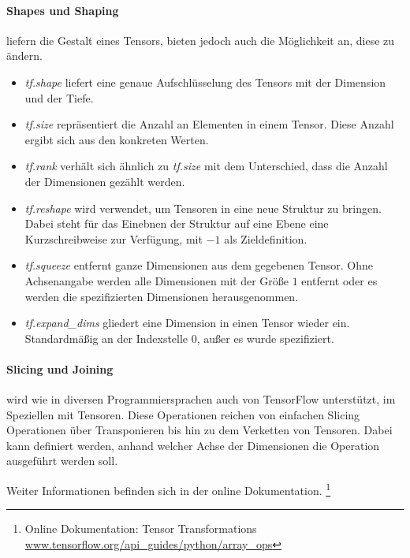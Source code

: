 \paragraph{Shapes und Shaping} liefern die Gestalt eines Tensors, bieten jedoch auch die Möglichkeit an, diese zu ändern. 
\begin{itemize}
	\item \textit{tf.shape} liefert eine genaue Aufschlüsselung des Tensors mit der Dimension und der Tiefe.
	\item \textit{tf.size} repräsentiert die Anzahl an Elementen in einem Tensor. 
	Diese Anzahl ergibt sich aus den konkreten Werten.
	\item \textit{tf.rank} verhält sich ähnlich zu \textit{tf.size} mit dem Unterschied, dass die Anzahl der Dimensionen gezählt werden.
	\item \textit{tf.reshape} wird verwendet, um Tensoren in eine neue Struktur zu bringen. 
	Dabei steht für das Einebnen der Struktur auf eine Ebene eine Kurzschreibweise zur Verfügung, mit $-1$ als Zieldefinition. 
	\item \textit{tf.squeeze} entfernt ganze Dimensionen aus dem gegebenen Tensor. 
	Ohne Achsenangabe werden alle Dimensionen mit der Größe $1$ entfernt oder es werden die spezifizierten Dimensionen herausgenommen.
	\item \textit{tf.expand\_dims} gliedert eine Dimension in einen Tensor wieder ein. 
	Standardmäßig an der Indexstelle $0$, außer es wurde spezifiziert.
\end{itemize}

\paragraph{Slicing und Joining} wird wie in diversen Programmiersprachen auch von TensorFlow unterstützt, im Speziellen mit Tensoren. 
Diese Operationen reichen von einfachen Slicing Operationen über Transponieren bis hin zu dem Verketten von Tensoren. 
Dabei kann definiert werden, anhand welcher Achse der Dimensionen die Operation ausgeführt werden soll.  
\phantom \newline

\noindent
Weiter Informationen befinden sich in der online Dokumentation. \footnote{Online Dokumentation: Tensor Transformations \url{www.tensorflow.org/api_guides/python/array_ops}}

